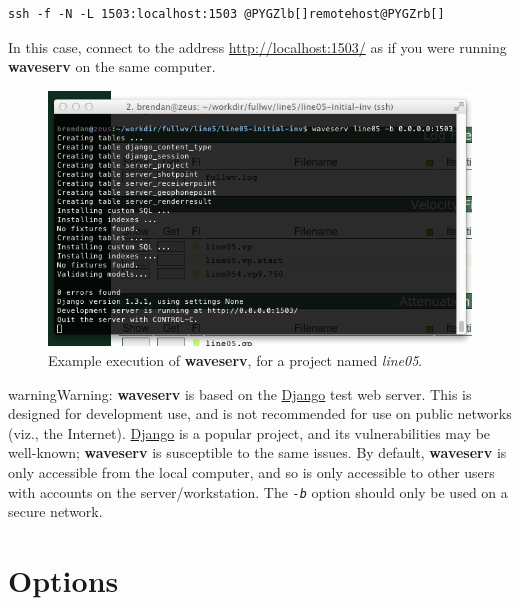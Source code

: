 \documentclass[letterpaper,10pt,english]{sphinxmanual}
\begin{document}
\begin{Verbatim}[commandchars=@\[\]]
ssh -f -N -L 1503:localhost:1503 @PYGZlb[]remotehost@PYGZrb[]
\end{Verbatim}

In this case, connect to the address \href{http://localhost:1503/}{http://localhost:1503/} as if you were running \textbf{waveserv} on the same computer.
\begin{figure}[htbp]
\centering
\capstart

\includegraphics{startcmd.png}
\caption{Example execution of \textbf{waveserv}, for a project named \emph{line05}.}\end{figure}

\begin{notice}{warning}{Warning:}
\textbf{waveserv} is based on the \href{http://www.djangoproject.com/}{Django} test web server.  This is designed for development use, and is not recommended for use on public networks (viz., the Internet).  \href{http://www.djangoproject.com/}{Django} is a popular project, and its vulnerabilities may be well-known; \textbf{waveserv} is susceptible to the same issues.  By default, \textbf{waveserv} is only accessible from the local computer, and so is only accessible to other users with accounts on the server/workstation.  The \emph{\texttt{-b}} option should only be used on a secure network.
\end{notice}


\section{Options}
\label{cli:options}

\begin{fulllineitems}
\label{cli:cmdoption-waveserv--version}
\end{fulllineitems}
\end{document}
